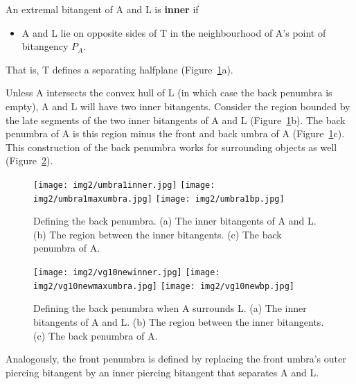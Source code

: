 \documentclass[9pt,twocolumn]{article}
\begin{document}
\begin{defn2}
An extremal bitangent of A and L is {\bf inner} if
\begin{itemize}
\item A and L lie on opposite sides of T in the neighbourhood of A's point of bitangency $P_A$.
\end{itemize}
That is, T defines a separating halfplane (Figure~\ref{fig:backpenumbra}a).
\end{defn2}

Unless A intersects the convex hull of L (in which case the back penumbra is empty),
A and L will have two inner bitangents.
Consider the region bounded by the late segments of the two
inner bitangents of A and L (Figure~\ref{fig:backpenumbra}b).
The back penumbra of A is this region minus the front and back umbra of A (Figure~\ref{fig:backpenumbra}c).
This construction of the back penumbra works for surrounding objects as well 
(Figure~\ref{fig:backpenumbrasurrounding}).

\begin{figure}
\begin{center}
\texttt{[image: img2/umbra1inner.jpg]}
\texttt{[image: img2/umbra1maxumbra.jpg]}
\texttt{[image: img2/umbra1bp.jpg]}
\end{center}
\caption{Defining the back penumbra. 
  (a) The inner bitangents of A and L.
  (b) The region between the inner bitangents.
  (c) The back penumbra of A.}
\label{fig:backpenumbra}
\end{figure}

\begin{figure}
\begin{center}
\texttt{[image: img2/vg10newinner.jpg]}
\texttt{[image: img2/vg10newmaxumbra.jpg]}
\texttt{[image: img2/vg10newbp.jpg]}
\end{center}
\caption{Defining the back penumbra when A surrounds L.
  (a) The inner bitangents of A and L.
  (b) The region between the inner bitangents.
  (c) The back penumbra of A.}
\label{fig:backpenumbrasurrounding}
\end{figure}

Analogously, the front penumbra is defined by replacing the front umbra's outer piercing bitangent by
an inner piercing bitangent that separates A and L.
\end{document}
